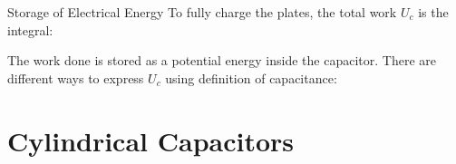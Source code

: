 \documentclass[12pt,aspectratio=169]{beamer}
\begin{document}
\begin{frame}{Storage of Electrical Energy}
  To fully charge the plates, the total work $U_c$ is the integral:


  The work done is stored as a potential energy inside the capacitor. There are
  different ways to express $U_c$ using definition of capacitance:

\end{frame}



\section{Cylindrical Capacitors}
\end{document}
